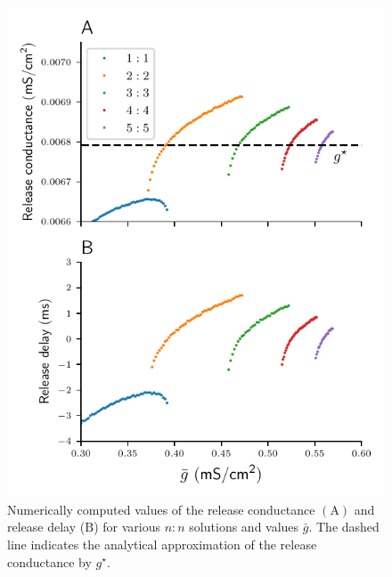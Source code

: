 \documentclass[utf8]{frontiersFPHY} %
\begin{document}
\begin{figure}[h!]
	\centering
	\includegraphics{gstar-diag}
	\caption{
		Numerically computed values of the release conductance $\bm{\mathrm{(A)}}$ and release delay ($\bm{\mathrm{B}}$) for various $n:n$ solutions and values $\bar g$. The dashed line indicates the analytical approximation of the release conductance by $g^{\star}$.\label{fig:gstar-diag}}
\end{figure}
\end{document}
